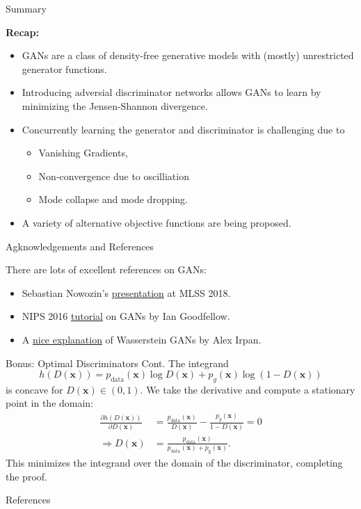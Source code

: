 \documentclass[notheorems]{beamer}
\newcommand{\xx}{\mathbf{x}}
\begin{document}
    \begin{frame}{Summary}

        \textbf{Recap:}
        \begin{itemize}
            \item GANs are a class of density-free generative models with (mostly) unrestricted generator functions.
            \item Introducing adversial discriminator networks allows GANs to learn by minimizing the Jensen-Shannon divergence.
            \item Concurrently learning the generator and discriminator is challenging due to
                \begin{itemize}
                    \item Vanishing Gradients,
                    \item Non-convergence due to oscilliation
                    \item Mode collapse and mode dropping.
                \end{itemize}
            \item A variety of alternative objective functions are being proposed.
        \end{itemize}

    \end{frame}

    \begin{frame}{Agknowledgements and References}

        There are lots of excellent references on GANs:
        \begin{itemize}
            \item Sebastian Nowozin's {\color{blue} \href{https://github.com/nowozin/mlss2018-madrid-gan}{presentation}} at MLSS 2018.
            \item NIPS 2016 {\color{blue} \href{https://arxiv.org/abs/1701.00160}{tutorial}} on GANs by Ian Goodfellow.
            \item A {\color{blue} \href{https://www.alexirpan.com/2017/02/22/wasserstein-gan.html}{nice explanation}} of Wasserstein GANs by Alex Irpan.
        \end{itemize}

    \end{frame}

    \begin{frame}{Bonus: Optimal Discriminators Cont.}
        The integrand
        \[ h(D(\xx)) = p_{\text{data}}(\xx) \log D(\xx) + p_g(\xx)\log(1-D(\xx)) \]
        is concave for $D(\xx) \in (0,1)$. We take the derivative and compute a stationary point in the domain:
        \begin{align*}
            \frac{\partial h(D(\xx))}{\partial D(\xx)} &= \frac{p_{\text{data}}(\xx)}{D(\xx)} - \frac{p_g(\xx)}{1-D(\xx)} = 0\\
            \Rightarrow D(\xx) &= \frac{p_{\text{data}}(\xx)}{p_{\text{data}}(\xx) + p_{\text{g}}(\xx)}.
        \end{align*}
        This minimizes the integrand over the domain of the discriminator, completing the proof.
    \end{frame}

    \begin{frame}[allowframebreaks]{References}
        
        
    \end{frame}
\end{document}

